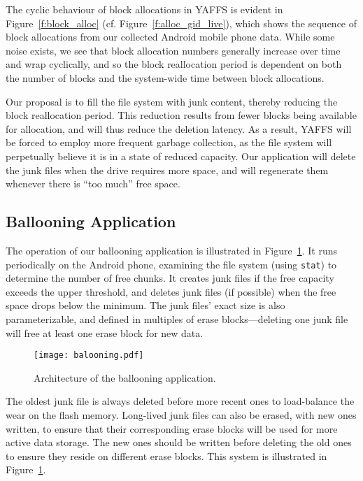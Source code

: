 \documentclass{acmtog}
\begin{document}
The cyclic behaviour of block allocations in YAFFS is evident in
Figure~\ref{f:block_alloc} (cf. Figure~\ref{f:alloc_gid_live}), which shows
the sequence of block allocations from our collected Android
mobile phone data. 
While some noise exists, we
see that block allocation numbers generally increase over time and  wrap
cyclically, and so the block reallocation period  
is dependent on both the number of blocks and
the system-wide time between block allocations.

Our proposal is to fill the file system with junk content, thereby reducing the
block reallocation period. This reduction results from  fewer blocks being
available for allocation, and will 
thus reduce the deletion latency. As a result,
YAFFS will be forced to employ more frequent garbage collection, as the file system
will perpetually believe it is in a state of reduced capacity. 
Our application will delete the junk files
when the drive requires more space, and will regenerate them whenever
there is ``too much'' free space.

\subsection{Ballooning Application} 

The operation of our ballooning application is illustrated in Figure~\ref{f:application}. It runs
periodically on the Android phone, examining the file system (using
\texttt{stat}) to determine the number of free chunks. It creates junk files if
the free capacity exceeds the upper threshold, and deletes junk files (if
possible) when the free space drops below the minimum.
The junk files' exact size is also
parameterizable, and defined in multiples of erase blocks---deleting one junk
file will free at least one erase block for new data.

\begin{figure}[t]
  \centering
  \texttt{[image: balooning.pdf]}
  \caption{\small Architecture of the ballooning
  application.\label{f:application}\normalsize}

\end{figure}


The oldest junk file is always deleted before more recent ones  to
load-balance the wear on the flash memory. Long-lived junk files can also
be erased, with new ones written, to ensure that their corresponding erase blocks will be used
for more active data storage. The new ones should be written before deleting
the old ones to ensure they reside on different erase blocks. This system is illustrated in
Figure~\ref{f:application}.
\end{document}
